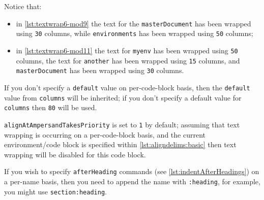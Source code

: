 	Notice that:
	\begin{itemize}
		\item in \cref{lst:textwrap6-mod9} the text for the \texttt{masterDocument} has been wrapped
		      using \texttt{30} columns, while \texttt{environments} has been wrapped using \texttt{50}
		      columns;
		\item in \cref{lst:textwrap6-mod11} the text for \texttt{myenv} has been wrapped using
		      \texttt{50} columns, the text for \texttt{another} has been wrapped using \texttt{15}
		      columns, and \texttt{masterDocument} has been wrapped using \texttt{30} columns.
	\end{itemize}
	If you don't specify a \texttt{default} value on per-code-block basis, then the
	\texttt{default} value from \texttt{columns} will be inherited; if you don't specify a
	default value for \texttt{columns} then \texttt{80} will be used.

	\texttt{alignAtAmpersandTakesPriority} is set to \texttt{1} by default; assuming
	that text wrapping is occurring on a per-code-block basis, and the current
	environment/code block is specified within \vref{lst:aligndelims:basic} then text
	wrapping will be disabled for this code block.

	If you wish to specify \texttt{afterHeading} commands (see
	\vref{lst:indentAfterHeadings}) on a per-name basis, then you need to append the name
	with \texttt{:heading}, for example, you might use \texttt{section:heading}.
